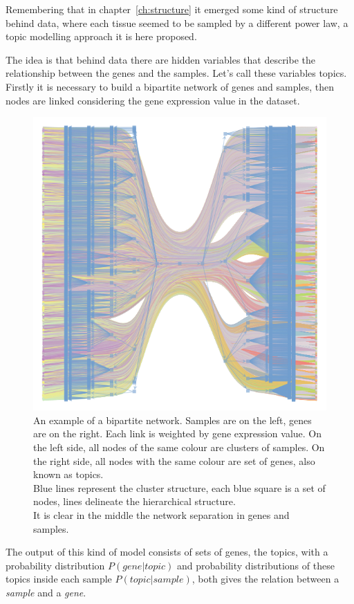Remembering that in chapter~\ref{ch:structure} it emerged some kind of structure behind data, where each tissue seemed to be sampled by a different power law, a topic modelling approach it is here proposed.

The idea is that behind data there are hidden variables that describe the relationship between the genes and the samples. Let's call these variables topics.
Firstly it is necessary to build a bipartite network of genes and samples, then nodes are linked considering the gene expression value in the dataset.
\begin{figure}[htb!]
    \centering
    \includegraphics[width=0.7\linewidth]{pictures/topic/bipartite.pdf}
    \caption{An example of a bipartite network. Samples are on the left, genes are on the right. Each link is weighted by gene expression value. On the left side, all nodes of the same colour are clusters of samples. On the right side, all nodes with the same colour are set of genes, also known as topics.\\ 
    Blue lines represent the cluster structure, each blue square is a set of nodes, lines delineate the hierarchical structure.\\
    It is clear in the middle the network separation in genes and samples.}
    \label{fig:topic/bipartite}
\end{figure}

The output of this kind of model consists of sets of genes, the topics, with a probability distribution $P(gene | topic)$ and probability distributions of these topics inside each sample $P(topic | sample)$, both gives the relation between a \textit{sample} and a \textit{gene}.


